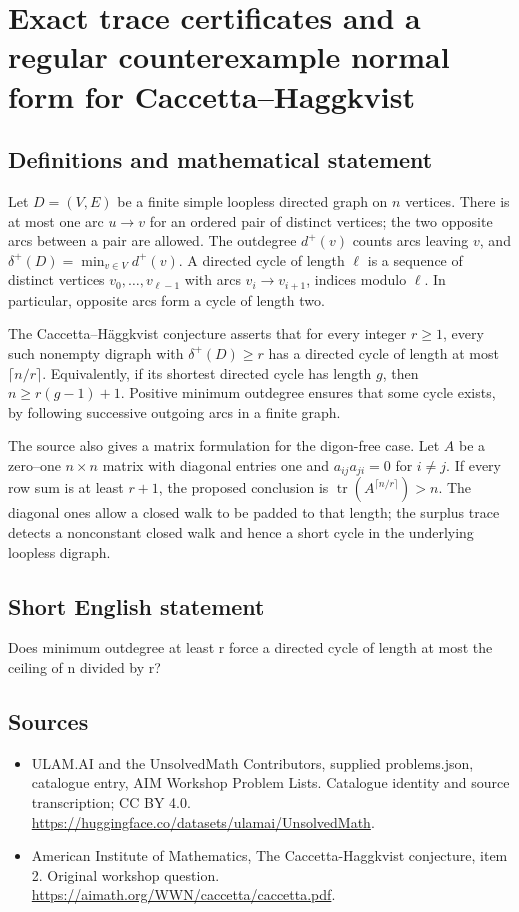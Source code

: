 \documentclass[11pt,a4paper]{article}
\begin{document}
\section*{Exact trace certificates and a regular counterexample normal form for Caccetta--Haggkvist}\label{statement}

\subsection{Definitions and mathematical statement}
Let $D=(V,E)$ be a finite simple loopless directed graph on $n$ vertices.
There is at most one arc $u\to v$ for an ordered pair of distinct
vertices; the two opposite arcs between a pair are allowed.
The outdegree $d^+(v)$ counts arcs leaving $v$, and
$\delta^+(D)=\min_{v\in V}d^+(v)$.
A directed cycle of length $\ell$ is a sequence of distinct vertices
$v_0,\ldots,v_{\ell-1}$ with arcs $v_i\to v_{i+1}$, indices modulo
$\ell$. In particular, opposite arcs form a cycle of length two.

The Caccetta--H\"aggkvist conjecture asserts that for every integer
$r\ge1$, every such nonempty digraph with $\delta^+(D)\ge r$ has a
directed cycle of length at most $\lceil n/r\rceil$.
Equivalently, if its shortest directed cycle has length $g$, then
$n\ge r(g-1)+1$. Positive minimum outdegree ensures that some cycle
exists, by following successive outgoing arcs in a finite graph.

The source also gives a matrix formulation for the digon-free case.
Let $A$ be a zero--one $n\times n$ matrix with diagonal entries one
and $a_{ij}a_{ji}=0$ for $i\ne j$. If every row sum is at least
$r+1$, the proposed conclusion is
$\operatorname{tr}(A^{\lceil n/r\rceil})>n$.
The diagonal ones allow a closed walk to be padded to that length;
the surplus trace detects a nonconstant closed walk and hence a short
cycle in the underlying loopless digraph.
\subsection{Short English statement}
Does minimum outdegree at least r force a directed cycle of length at most the ceiling of n divided by r?
\subsection{Sources}
\begin{itemize}
\item[S1] ULAM.AI and the UnsolvedMath Contributors, supplied problems.json, catalogue entry, AIM Workshop Problem Lists. Catalogue identity and source transcription; CC BY 4.0.
\url{https://huggingface.co/datasets/ulamai/UnsolvedMath}.
\item[S2] American Institute of Mathematics, The Caccetta-Haggkvist conjecture, item 2. Original workshop question.
\url{https://aimath.org/WWN/caccetta/caccetta.pdf}.
\end{itemize}
\end{document}
